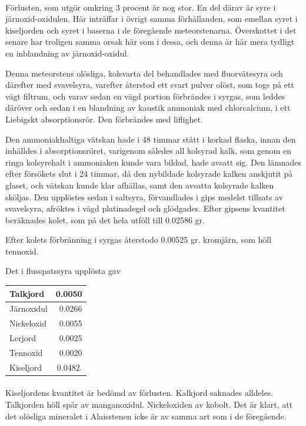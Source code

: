 \documentclass[a4paper, 12pt, oneside, swedish]{article}
\begin{document}
\paragraph{}
Förlusten, som utgör omkring 3 procent är nog stor. En del därav är syre i järnoxid-oxidulen. Här inträffar i övrigt samma förhållanden, som emellan syret i kiseljorden och syret i baserna i de föregående meteorstenarna. Överskottet i det senare har troligen samma orsak här som i dessa, och denna är här mera tydligt en inblandning av järnoxid-oxidul.

Denna meteorstens olösliga, kolsvarta del behandlades med fluorvätesyra och därefter med svavelsyra, varefter återstod ett svart pulver olöst, som togs på ett vägt filtrum, och varav sedan en vägd portion förbrändes i syrgas, som leddes däröver och sedan i en blandning av kaustik ammoniak med chlorcalcium, i ett Liebigskt absorptionsrör. Den förbrändes med liflighet.

Den ammoniakhaltiga vätskan hade i 48 timmar stått i korkad flaska, innan den inhälldes i absorptionsröret, varigenom således all kolsyrad kalk, som genom en ringa kolsyrehalt i ammoniaken kunde vara bildad, hade avsatt sig. Den lämnades efter försökets slut i 24 timmar, då den nybildade kolsyrade kalken anskjutit på glaset, och vätskan kunde klar afhällas, samt den avsatta kolsyrade kalken sköljas. Den upplöstes sedan i saltsyra, förvandlades i gips medelst tillsats av svavelsyra, afröktes i vägd platinadegel och glödgades. Efter gipsens kvantitet beräknades kolet, som på det hela utföll till 0.02586 gr.

Efter kolets förbränning i syrgas återstodo 0.00525 gr. kromjärn, som höll tennoxid.

Det i flusspatssyra upplösta gav
\begin{table}[H]
    \centering\small
    \begin{tabular}{|l|r|}
    \hline
        Talkjord & 0.0050 \\ \hline
        Järnoxidul & 0.0266 \\ \hline
        Nickeloxid & 0.0055 \\ \hline
        Lerjord & 0.0025 \\ \hline
        Tennoxid & 0.0020 \\ \hline
        Kiseljord & 0.0482. \\ \hline
    \end{tabular}
\end{table}
\paragraph{}
Kiseljordens kvantitet är bedömd av förlusten. Kalkjord saknades alldeles. Talkjorden höll spår av manganoxidul. Nickeloxiden av kobolt. Det är klart, att det olösliga mineralet i Alaisstenen icke är av samma art som i de föregående.
\end{document}
